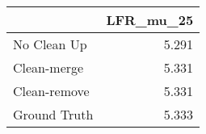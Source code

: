 \begin{tabular}{lr}
\toprule
{} & LFR_mu_25 \\
\midrule
No Clean Up  &     5.291 \\
Clean-merge  &     5.331 \\
Clean-remove &     5.331 \\
Ground Truth &     5.333 \\
\bottomrule
\end{tabular}
